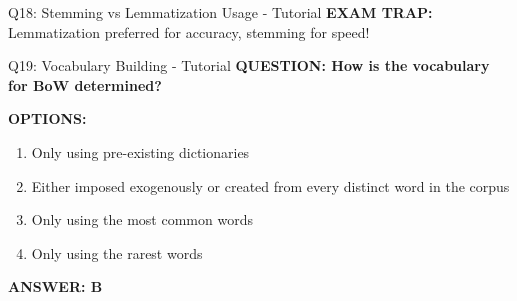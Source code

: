 \documentclass[8pt]{beamer}
\begin{document}
\begin{frame}{Q18: Stemming vs Lemmatization Usage - Tutorial}
	\textcolor{myred}{\textbf{EXAM TRAP:}} Lemmatization preferred for \textcolor{myblue}{accuracy}, stemming for \textcolor{myblue}{speed}!
\end{frame}










	
	\begin{frame}{Q19: Vocabulary Building - Tutorial}
		\fontsize{6.5}{7.5}\selectfont
		\textbf{QUESTION: How is the vocabulary for BoW determined?}
		
		\vspace{0.1cm}
		\textbf{OPTIONS:}
		\begin{enumerate}
			\item Only using pre-existing dictionaries
			\item Either imposed exogenously or created from every distinct word in the corpus
			\item Only using the most common words
			\item Only using the rarest words
		\end{enumerate}
		
		\vspace{0.1cm}
		\textcolor{myblue}{\textbf{ANSWER: B}}
		

\end{frame}
\end{document}
